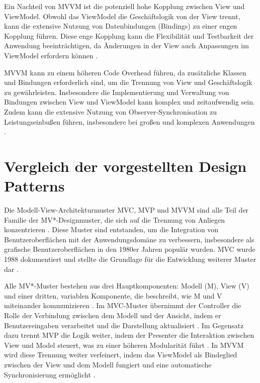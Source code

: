 Ein Nachteil von \ac{MVVM} ist die potenziell hohe Kopplung zwischen View und ViewModel. Obwohl das ViewModel die Geschäftslogik von der View trennt, kann die extensive Nutzung von Datenbindungen (Bindings) zu einer engen Kopplung führen. Diese enge Kopplung kann die Flexibilität und Testbarkeit der Anwendung beeinträchtigen, da Änderungen in der View auch Anpassungen im ViewModel erfordern können \cite{arcos2018comparative}.

\ac{MVVM} kann zu einem höheren Code Overhead führen, da zusätzliche Klassen und Bindungen erforderlich sind, um die Trennung von View und Geschäftslogik zu gewährleisten. Insbesondere die Implementierung und Verwaltung von Bindungen zwischen View und ViewModel kann komplex und zeitaufwendig sein. Zudem kann die extensive Nutzung von Observer-Synchronisation zu Leistungseinbußen führen, insbesondere bei großen und komplexen Anwendungen \cite{arcos2018comparative}.

\section{Vergleich der vorgestellten Design Patterns}
Die Modell-View-Architekturmuster \ac{MVC}, \ac{MVP} und \ac{MVVM} sind alle Teil der Familie der MV*-Designmuster, die sich auf die Trennung von Anliegen konzentrieren \cite{aihara2012mvc}. Diese Muster sind entstanden, um die Integration von Benutzeroberflächen mit der Anwendungsdomäne zu verbessern, insbesondere als grafische Benutzeroberflächen in den 1980er Jahren populär wurden. \ac{MVC} wurde 1988 dokumentiert und stellte die Grundlage für die Entwicklung weiterer Muster dar \cite{aihara2012mvc}.

Alle MV*-Muster bestehen aus drei Hauptkomponenten: Modell (M), View (V) und einer dritten, variablen Komponente, die beschreibt, wie M und V miteinander kommunizieren \cite{aihara2012mvc}. Im \ac{MVC}-Muster übernimmt der Controller die Rolle der Verbindung zwischen dem Modell und der Ansicht, indem er Benutzereingaben verarbeitet und die Darstellung aktualisiert \cite{aihara2012mvc}. Im Gegensatz dazu trennt \ac{MVP} die Logik weiter, indem der Presenter die Interaktion zwischen View und Model steuert, was zu einer höheren Modularität führt \cite{aihara2012mvc}. In \ac{MVVM} wird diese Trennung weiter verfeinert, indem das ViewModel als Bindeglied zwischen der View und dem Modell fungiert und eine automatische Synchronisierung ermöglicht \cite{aihara2012mvc}.